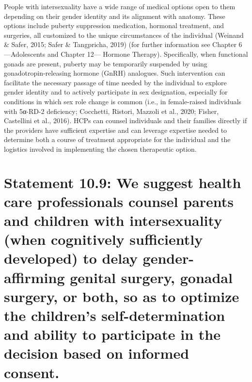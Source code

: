 \documentclass[
]{book}
\begin{document}
People with intersexuality have a wide range
of medical options open to them depending on
their gender identity and its alignment with anatomy. These options include puberty suppression
medication, hormonal treatment, and surgeries,
all customized to the unique circumstances of
the individual (Weinand \& Safer, 2015; Safer \&
Tangpricha, 2019) (for further information see
Chapter 6---Adolescents and Chapter 12---
Hormone Therapy). Specifically, when functional
gonads are present, puberty may be temporarily
suspended by using gonadotropin-releasing hormone (GnRH) analogues. Such intervention can
facilitate the necessary passage of time needed
by the individual to explore gender identity and
to actively participate in sex designation, especially for conditions in which sex role change is
common (i.e., in female-raised individuals with
5α-RD-2 deficiency; Cocchetti, Ristori, Mazzoli
et al., 2020; Fisher, Castellini et al., 2016).
HCPs can counsel individuals and their families directly if the providers have sufficient
expertise and can leverage expertise needed to
determine both a course of treatment appropriate
for the individual and the logistics involved in
implementing the chosen therapeutic option.

\hypertarget{statement-10.9-we-suggest-health-care-professionals-counsel-parents-and-children-with-intersexuality-when-cognitively-sufficiently-developed-to-delay-gender-affirming-genital-surgery-gonadal-surgery-or-both-so-as-to-optimize-the-childrens-self-determination-and-ability-to-participate-in-the-decision-based-on-informed-consent.}{%
\section*{Statement 10.9: We suggest health care professionals counsel parents and children with intersexuality (when cognitively sufficiently developed) to delay gender-affirming genital surgery, gonadal surgery, or both, so as to optimize the children's self-determination and ability to participate in the decision based on informed consent.}\label{statement-10.9-we-suggest-health-care-professionals-counsel-parents-and-children-with-intersexuality-when-cognitively-sufficiently-developed-to-delay-gender-affirming-genital-surgery-gonadal-surgery-or-both-so-as-to-optimize-the-childrens-self-determination-and-ability-to-participate-in-the-decision-based-on-informed-consent.}}
\end{document}

